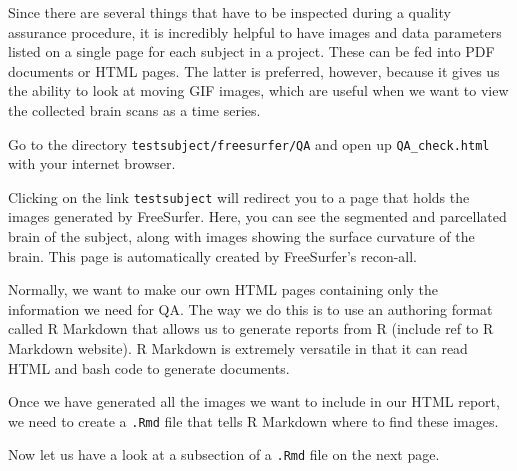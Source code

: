 Since there are several things that have to be inspected during a quality assurance procedure, it is incredibly helpful to have images and data parameters listed on a single page for each subject in a project. These can be fed into PDF documents or HTML pages. The latter is preferred, however, because it gives us the ability to look at moving GIF images, which are useful when we want to view the collected brain scans as a time series. 

Go to the directory \texttt{testsubject/freesurfer/QA} and open up \texttt{QA_check.html} with your internet browser. 

Clicking on the link \texttt{testsubject} will redirect you to a page that holds the images generated by FreeSurfer. Here, you can see the segmented and parcellated brain of the subject, along with images showing the surface curvature of the brain. This page is automatically created by FreeSurfer's recon-all.

Normally, we want to make our own HTML pages containing only the information we need for QA. The way we do this is to use an authoring format called R Markdown that allows us to generate reports from R (include ref to R Markdown website). R Markdown is extremely versatile in that it can read HTML and bash code to generate documents. 

Once we have generated all the images we want to include in our HTML report, we need to create a \texttt{.Rmd} file that tells R Markdown where to find these images. 

Now let us have a look at a subsection of a \texttt{.Rmd} file on the next page.
\clearpage

